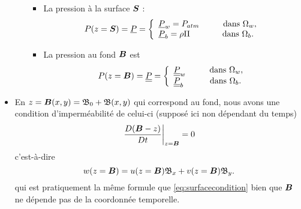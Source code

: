 \begin{itemize}[label=$\mybullet$]
\begin{itemize}[label=$\mybullet\mybullet$]
		\begin{itemize}[label=$\mybullet\mybullet\mybullet$]
			\item La pression à la surface $\boldsymbol{S}$ :
			\begin{equation} 
				P(z=\boldsymbol{S}) = \underline{P} = \left\{
				\begin{array}{l}
				\underline{P}_w = P_{atm}\hspace{1cm}\text{dans $\Omega_w$,}\\
				\underline{P}_b = \rho\Pi\hspace{1.36cm}\text{dans $\Omega_b$.}
				\end{array}\right. \label{eq:pression_surface}
			\end{equation}
			\item La pression au fond $\boldsymbol{B}$ est 
			\begin{equation} 
			P(z=\boldsymbol{B}) = \underline{\underline{P}} = \left\{
			\begin{array}{l}
			\underline{\underline{P}}_w\hspace{1cm}\text{dans $\Omega_w$,}\\
			\underline{\underline{P}}_b\hspace{1.1cm}\text{dans $\Omega_b$.}
			\end{array}\right. \label{eq:pression_fond}
			\end{equation}
		\end{itemize}
	\end{itemize}
	\item En $z = \boldsymbol{B}(x, y) = \mathfrak{B}_0 + \mathfrak{B}(x, y)$ qui correspond au fond, nous avons une condition d'imperméabilité de celui-ci (supposé ici non dépendant du temps)
	\begin{equation*}
	\left. \frac{D (\boldsymbol{B} - z)}{Dt} \right|_{z=\boldsymbol{B}} = 0
	\end{equation*}
	c'est-à-dire
	\begin{equation}
	w(z = \boldsymbol{B}) = u(z=\boldsymbol{B})\mathfrak{B}_x + v(z=\boldsymbol{B})\mathfrak{B}_y.\label{eq:fondcondition}
	\end{equation}
	qui est pratiquement la même formule que \eqref{eq:surfacecondition} bien que $\boldsymbol{B}$ ne dépende pas de la coordonnée temporelle.
\end{itemize}


